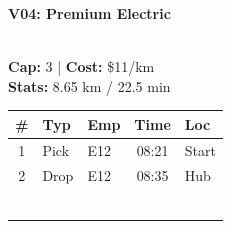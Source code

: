 \documentclass[a4paper,11pt]{article}
\begin{document}
\begin{minipage}[t]{0.32\textwidth}
    \centering
    \colorbox{velorablue}{\parbox{\dimexpr\linewidth-2\fboxsep}{\centering \color{white}\textbf{V04: Premium Electric}}} \\
    \vspace{0.05cm}
    {\scriptsize \textbf{Cap:} 3 | \textbf{Cost:} \$11/km \\ \textbf{Stats:} 8.65 km / 22.5 min}
    \vspace{0.1cm}
    
    \renewcommand{\arraystretch}{1.1}
    \setlength{\tabcolsep}{2pt}
    \scriptsize
    \begin{tabular}{c l l c l}
        \toprule
        \textbf{\#} & \textbf{Typ} & \textbf{Emp} & \textbf{Time} & \textbf{Loc} \\
        \midrule
        1 & Pick & E12 & 08:21 & Start \\
        \rowcolor{headergray} 2 & Drop & E12 & 08:35 & Hub \\
        & & & & \\
        & & & & \\
        & & & & \\
        & & & & \\
        & & & & \\
        & & & & \\
        \bottomrule
    \end{tabular}
\end{minipage}
\hfill
\end{document}
